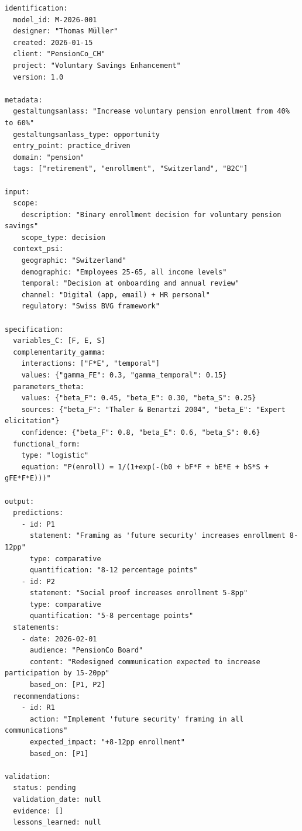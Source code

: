 \begin{tcolorbox}[colback=white, colframe=black,
    title=Example Registry Entry: M-2026-001]
\begin{verbatim}
identification:
  model_id: M-2026-001
  designer: "Thomas Müller"
  created: 2026-01-15
  client: "PensionCo_CH"
  project: "Voluntary Savings Enhancement"
  version: 1.0

metadata:
  gestaltungsanlass: "Increase voluntary pension enrollment from 40% to 60%"
  gestaltungsanlass_type: opportunity
  entry_point: practice_driven
  domain: "pension"
  tags: ["retirement", "enrollment", "Switzerland", "B2C"]

input:
  scope:
    description: "Binary enrollment decision for voluntary pension savings"
    scope_type: decision
  context_psi:
    geographic: "Switzerland"
    demographic: "Employees 25-65, all income levels"
    temporal: "Decision at onboarding and annual review"
    channel: "Digital (app, email) + HR personal"
    regulatory: "Swiss BVG framework"

specification:
  variables_C: [F, E, S]
  complementarity_gamma:
    interactions: ["F*E", "temporal"]
    values: {"gamma_FE": 0.3, "gamma_temporal": 0.15}
  parameters_theta:
    values: {"beta_F": 0.45, "beta_E": 0.30, "beta_S": 0.25}
    sources: {"beta_F": "Thaler & Benartzi 2004", "beta_E": "Expert elicitation"}
    confidence: {"beta_F": 0.8, "beta_E": 0.6, "beta_S": 0.6}
  functional_form:
    type: "logistic"
    equation: "P(enroll) = 1/(1+exp(-(b0 + bF*F + bE*E + bS*S + gFE*F*E)))"

output:
  predictions:
    - id: P1
      statement: "Framing as 'future security' increases enrollment 8-12pp"
      type: comparative
      quantification: "8-12 percentage points"
    - id: P2
      statement: "Social proof increases enrollment 5-8pp"
      type: comparative
      quantification: "5-8 percentage points"
  statements:
    - date: 2026-02-01
      audience: "PensionCo Board"
      content: "Redesigned communication expected to increase participation by 15-20pp"
      based_on: [P1, P2]
  recommendations:
    - id: R1
      action: "Implement 'future security' framing in all communications"
      expected_impact: "+8-12pp enrollment"
      based_on: [P1]

validation:
  status: pending
  validation_date: null
  evidence: []
  lessons_learned: null
\end{verbatim}
\end{tcolorbox}


